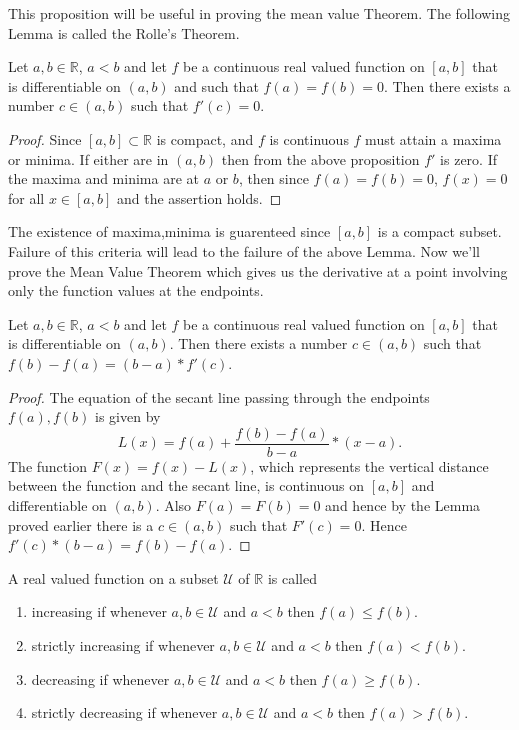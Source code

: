This proposition will be useful in proving the mean value Theorem. The following Lemma is called the
Rolle's Theorem.
\begin{Lemma}
    Let $a,b \in \mathbb{R}$, $a < b$ and let $f$ be a continuous real valued function on
    $\left[a,b\right]$ that is differentiable on $(a,b)$ and such that $f(a) = f(b) = 0$. Then there
    exists a number $c \in (a,b)$ such that $f'(c) = 0$.
\end{Lemma}
\begin{proof}
    Since $\left[a,b\right] \subset \mathbb{R}$ is compact, and $f$ is continuous $f$ must attain a
    maxima or minima. If either are in $(a,b)$ then from the above proposition $f'$ is zero. If the
    maxima and minima are at $a$ or $b$, then since $f(a) = f(b) = 0$, $f(x) = 0$ for all $x \in 
    \left[a,b\right] $ and the assertion holds.
\end{proof}
The existence of maxima,minima is guarenteed since $\left[a,b\right]$ is a compact subset. Failure
of this criteria will lead to the failure of the above Lemma. Now we'll prove the Mean Value Theorem
which gives us the derivative at a point involving only the function values at the endpoints. 
\begin{Theorem}[name=Mean Value Theorem]
    Let $a,b \in \mathbb{R}$, $a < b$ and let $f$ be a continuous real valued function on $\left[
	a,b\right]$ that is differentiable on $(a,b)$. Then there exists a number $c \in (a,b)$ such
    that $f(b) - f(a) = (b-a)*f'(c)$.
\end{Theorem}
\begin{proof}
    The equation of the secant line passing through the endpoints $f(a),f(b)$ is given by 
    \[L(x) = f(a) + \frac{f(b) - f(a)}{b - a}*(x - a).\]
    The function $F(x) = f(x) - L(x)$, which represents the vertical distance between the function
    and the secant line, is continuous on $\left[a,b\right]$ and differentiable on $(a,b)$. Also
    $F(a) = F(b) = 0$ and hence by the Lemma proved earlier there is a $ c \in (a,b)$ such that
    $F'(c) = 0$. Hence $f'(c)*(b-a) = f(b) - f(a)$.
\end{proof}
\begin{Definition}
    A real valued function on a subset $\mathcal{U}$ of $\mathbb{R}$ is called 
    \begin{enumerate}
	\item increasing if whenever $a,b \in \mathcal{U}$ and $a < b$ then $f(a) \leq f(b)$.
	\item strictly increasing if whenever $a,b \in \mathcal{U}$ and $a < b$ then $f(a) < f(b)$.
	\item decreasing if whenever $a,b \in \mathcal{U}$ and $a < b$ then $f(a) \geq f(b)$.
	\item strictly decreasing if whenever $a,b \in \mathcal{U}$ and $a < b$ then $f(a) > f(b)$.
    \end{enumerate}
\end{Definition}
